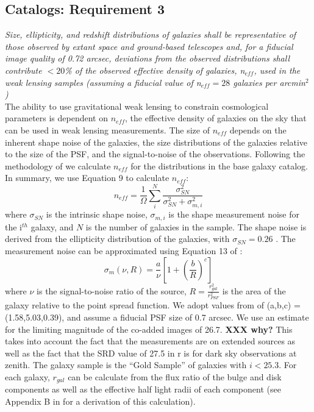 \documentclass[]{article}
\begin{document}
\subsection{Catalogs:  Requirement 3}

{\it Size, ellipticity, and redshift distributions of galaxies shall
  be representative of those observed by extant space and ground-based
  telescopes and, for a fiducial image quality of 0.72 arcsec,
  deviations from the observed distributions shall contribute $<20$\%
  of the observed effective density of galaxies, n$_{eff}$, used in
  the weak lensing samples (assuming a fiducial value of n$_{eff} =
  28$ galaxies per arcmin$^2$)}\\


The ability to use gravitational weak lensing to constrain
cosmological parameters is dependent on $n_{eff}$, the effective
density of galaxies on the sky that can be used in weak lensing
measurements. The size of $n_{eff}$ depends on the inherent shape
noise of the galaxies, the size distributions of the galaxies relative
to the size of the PSF, and the signal-to-noise of the observations.
Following the methodology of \citet{chang} we calculate $n_{eff}$ for
the distributions in the base galaxy catalog.  In summary, we use
Equation 9 to calculate $n_{eff}$:
\begin{equation}
n_{eff} = \frac{1}{\Omega}\sum^N_i\frac{\sigma^2_{SN}}{\sigma^2_{SN}+\sigma^2_{m,i}}
\end{equation}
where $\sigma_{SN}$ is the intrinsic shape noise, $\sigma_{m,i}$ is
the shape measurement noise for the i$^{th}$ galaxy, and $N$ is the
number of galaxies in the sample. The shape noise is derived from the
ellipticity distribution of the galaxies, with $\sigma_{SN} = 0.26$
\citep{chang}.  The measurement noise can be approximated using
Equation 13 of \citet{chang}:
\begin{equation}
\sigma_m(\nu,R) = \frac{a}{\nu}\left[1+\left(\frac{b}{R}\right)^c\right]
\end{equation}
where $\nu$ is the signal-to-noise ratio of the source,
$R=\frac{r_{gal}^2}{r_{PSF}^2}$ is the area of the galaxy relative to
the point spread function.  We adopt values from \citet{chang} of
(a,b,c) = (1.58,5.03,0.39), and assume a fiducial PSF size of 0.7
arcsec. We use an estimate for the limiting magnitude of the co-added
images of 26.7.  {\bf XXX why?} This takes into account the fact that
the measurements are on extended sources as well as the fact that the
SRD value of 27.5 in r is for dark sky observations at zenith.  The
galaxy sample is the ``Gold Sample'' of galaxies with $i < 25.3$.  For
each galaxy, $r_{gal}$ can be calculate from the flux ratio of the
bulge and disk components as well as the effective half light radii of
each component (see Appendix B in \citet{chang} for a derivation of
this calculation).
\end{document}
